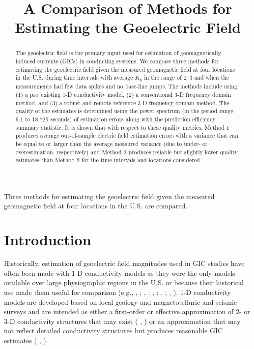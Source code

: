 \documentclass[linenumbers,draft]{agujournal}
\newcommand{\citeay}[1]{%
\citeauthor{#1}, \citeyear{#1}%
}
\begin{document}
\title{A Comparison of Methods for Estimating the Geoelectric Field}




\begin{keypoints}
\item Three methods for estimating the geoelectric field given the measured geomagnetic field at four locations in the U.S. are compared.
\end{keypoints}

%
%

\begin{abstract}
The geoelectric field is the primary input used for estimation of geomagnetically induced currents (GICs) in conducting systems.  We compare three methods for estimating the geoelectric field given the measured geomagnetic field at four locations in the U.S. during time intervals with average $K_p$ in the range of 2--3 and when the measurements had few data spikes and no base-line jumps.  The methods include using: (1) a pre--existing 1-D conductivity model, (2) a conventional 3-D frequency domain method, and (3) a robust and remote reference 3-D frequency domain method.  The quality of the estimates is determined using the power spectrum (in the period range 9.1 to 18,725 seconds) of estimation errors along with the prediction efficiency summary statistic. It is shown that with respect to these quality metrics, Method 1 produces average out-of-sample electric field estimation errors with a variance that can be equal to or larger than the average measured variance (due to under- or overestimation, respectively) and Method 3 produces reliable but slightly lower quality estimates than Method 2 for the time intervals and locations considered. 
\end{abstract}

\section{Introduction}

Historically, estimation of geoelectric field magnitudes used in GIC studies have often been made with 1-D conductivity models as they were the only models available over large physiographic regions in the U.S. or because their historical use made them useful for comparison (e.g., \citeay{Pulkkinen2012}; \citeay{Wei2013}; \citeay{Viljanen2014}; \citeay{Boteler2015}; \citeay{NERC2015}).  1-D conductivity models are developed based on local geology and magnetotelluric and seismic surveys and are intended as either a first-order or effective approximation of 2- or 3-D conductivity structures that may exist (\citeay{Fernberg2012}) or an approximation that may not reflect detailed conductivity structures but produces reasonable GIC estimates (\citeay{Boteler2015}). 
\end{document}
